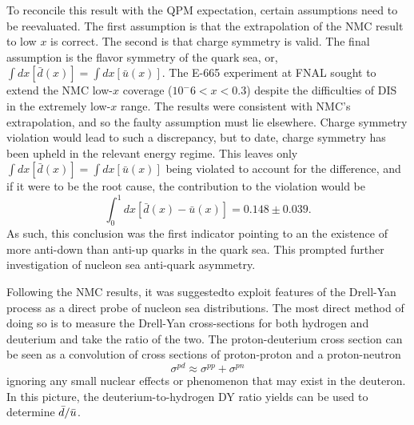 To reconcile this result with the QPM expectation, certain assumptions need to be reevaluated. The first assumption is that the extrapolation of the NMC result to low $x$ is correct. The second is that charge symmetry is valid. The final assumption is the flavor symmetry of the quark sea, or, $\int dx [\bar{d}(x)] = \int dx [\bar{u}(x)]$. The E-665 experiment at FNAL sought to extend the NMC low-$x$ coverage ($10^-6 < x < 0.3$) despite the difficulties of DIS in the extremely low-$x$ range. The results were consistent with NMC's extrapolation\CN, and so the faulty assumption must lie elsewhere. Charge symmetry violation would lead to such a discrepancy, but to date, charge symmetry has been upheld in the relevant energy regime\cite{Abegg:1998sg}. This leaves only $\int dx [\bar{d}(x)] = \int dx [\bar{u}(x)]$ being violated to account for the difference, and if it were to be the root cause, the contribution to the violation would be
\begin{equation}
\int_0^1 dx[\bar{d}(x) - \bar{u}(x)] = 0.148 \pm 0.039.
\end{equation}
As such, this conclusion was the first indicator pointing to an the existence of more anti-down than anti-up quarks in the quark sea. This prompted further investigation of nucleon sea anti-quark asymmetry.

Following the NMC results, it was suggested\CN to exploit features of the Drell-Yan process as a direct probe of nucleon sea distributions. The most direct method of doing so is to measure the Drell-Yan cross-sections for both hydrogen and deuterium and take the ratio of the two. The proton-deuterium cross section can be seen as a convolution of cross sections of proton-proton and a proton-neutron
\begin{equation}
\sigma^{pd} \approx \sigma^{pp} + \sigma^{pn}
\end{equation}
ignoring any small nuclear effects or phenomenon that may exist in the deuteron. In this picture, the deuterium-to-hydrogen DY ratio yields can be used to determine $\bar{d}/\bar{u}$.

